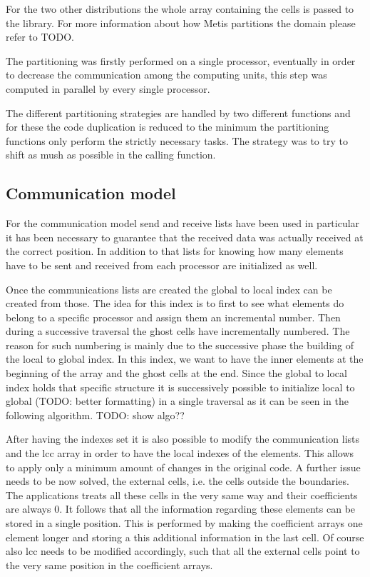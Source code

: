 \documentclass[12pt, a4paper]{article}
\begin{document}
  For the two other distributions the whole array containing the cells is passed
  to the library. For more information about how Metis partitions the domain
  please refer to TODO.

  The partitioning was firstly performed on a single processor, eventually in
  order to decrease the communication among the computing units, this step was
  computed in parallel by every single processor.

  The different partitioning strategies are handled by two different functions
  and for these the code duplication is reduced to the minimum the partitioning
  functions only perform the strictly necessary tasks. The strategy was to try
  to shift as mush as possible in the calling function.

  \subsection*{Communication model}
  For the communication model send and receive lists have been used in
  particular it has been necessary to guarantee that the received data was
  actually received at the correct position. In addition to that lists for
  knowing how many elements have to be sent and received from each processor are
  initialized as well.

  Once the communications lists are created the global to local index can be
  created from those. The idea for this index is to first to see what elements
  do belong to a specific processor and assign them an incremental number. Then
  during a successive traversal the ghost cells have incrementally numbered.
  The reason for such numbering is mainly due to the successive phase the
  building of the local to global index. In this index, we want to have the
  inner elements at the beginning of the array and the ghost cells at the end.
  Since the global to local index holds that specific structure it is
  successively possible to initialize local to global (TODO: better formatting)
  in a single traversal as it can be seen in the following algorithm.
  TODO: show algo??

  After having the indexes set it is also possible to modify the communication 
  lists and the lcc array in order to have the local indexes of the elements. 
  This allows to apply only a minimum amount of changes in the original code.
  A further issue needs to be now solved, the external cells, i.e. the cells
  outside the boundaries. The applications treats all these cells in the very
  same way and their coefficients are always $0$. It follows that all the
  information regarding these elements can be stored in a single position. This
  is performed by making the coefficient arrays one element longer and storing a
  this additional information in the last cell. Of course also lcc needs to be
  modified accordingly, such that all the external cells point to the very same
  position in the coefficient arrays.
\end{document}
